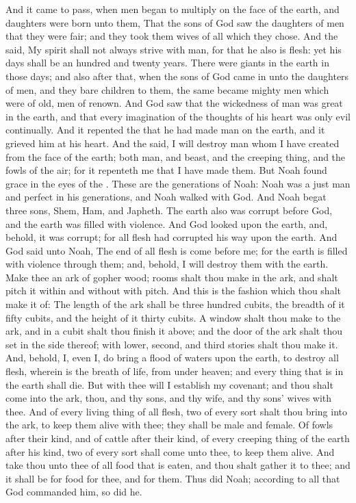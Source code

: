 \begin{biblechapter} %
 And it came to pass, when men began to multiply on the face of the earth, and daughters were born unto them,
\verse That the sons of God saw the daughters of men that they were fair; and they took them wives of all which they chose.
\verse And the \LORD said, My spirit shall not always strive with man, for that he also is flesh: yet his days shall be an hundred and twenty years.
\verse There were giants in the earth in those days; and also after that, when the sons of God came in unto the daughters of men, and they bare children to them, the same became mighty men which were of old, men of renown.
\verse And God saw that the wickedness of man was great in the earth, and that every imagination of the thoughts of his heart was only evil continually.
\verse And it repented the \LORD that he had made man on the earth, and it grieved him at his heart.
\verse And the \LORD said, I will destroy man whom I have created from the face of the earth; both man, and beast, and the creeping thing, and the fowls of the air; for it repenteth me that I have made them.
\verse But Noah found grace in the eyes of the \LORD.
\verse These are the generations of Noah: Noah was a just man and perfect in his generations, and Noah walked with God.
\verse And Noah begat three sons, Shem, Ham, and Japheth.
\verse The earth also was corrupt before God, and the earth was filled with violence.
\verse And God looked upon the earth, and, behold, it was corrupt; for all flesh had corrupted his way upon the earth.
\verse And God said unto Noah, The end of all flesh is come before me; for the earth is filled with violence through them; and, behold, I will destroy them with the earth.
\verse Make thee an ark of gopher wood; rooms shalt thou make in the ark, and shalt pitch it within and without with pitch.
\verse And this is the fashion which thou shalt make it of: The length of the ark shall be three hundred cubits, the breadth of it fifty cubits, and the height of it thirty cubits.
\verse A window shalt thou make to the ark, and in a cubit shalt thou finish it above; and the door of the ark shalt thou set in the side thereof; with lower, second, and third stories shalt thou make it.
\verse And, behold, I, even I, do bring a flood of waters upon the earth, to destroy all flesh, wherein is the breath of life, from under heaven; and every thing that is in the earth shall die.
\verse But with thee will I establish my covenant; and thou shalt come into the ark, thou, and thy sons, and thy wife, and thy sons' wives with thee.
\verse And of every living thing of all flesh, two of every sort shalt thou bring into the ark, to keep them alive with thee; they shall be male and female.
\verse Of fowls after their kind, and of cattle after their kind, of every creeping thing of the earth after his kind, two of every sort shall come unto thee, to keep them alive.
\verse And take thou unto thee of all food that is eaten, and thou shalt gather it to thee; and it shall be for food for thee, and for them.
\verse Thus did Noah; according to all that God commanded him, so did he.
\end{biblechapter}

